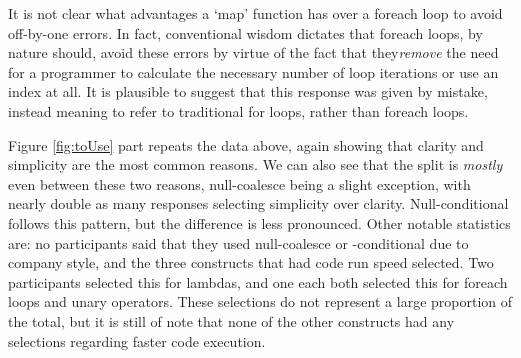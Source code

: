 \documentclass{article}
\begin{document}
            It is not clear what advantages a `map' function has over a foreach loop to avoid off-by-one errors. In fact, conventional wisdom dictates that foreach loops, by nature should, avoid these errors by virtue of the fact that they\emph{remove} the need for a programmer to calculate the necessary number of loop iterations or use an index at all. It is plausible to suggest that this response was given by mistake, instead meaning to refer to traditional for loops, rather than foreach loops.

            Figure \ref{fig:toUse} part repeats the data above, again showing that clarity and simplicity are the most common reasons. We can also see that the split is \emph{mostly} even between these two reasons, null-coalesce being a slight exception, with nearly double as many responses selecting simplicity over clarity. Null-conditional follows this pattern, but the difference is less pronounced.
            Other notable statistics are: no participants said that they used null-coalesce or -conditional due to company style, and the three constructs that had code run speed selected. Two participants selected this for lambdas, and one each both selected this for foreach loops and unary operators. These selections do not represent a large proportion of the total, but it is still of note that none of the other constructs had any selections regarding faster code execution.
            
\end{document}
